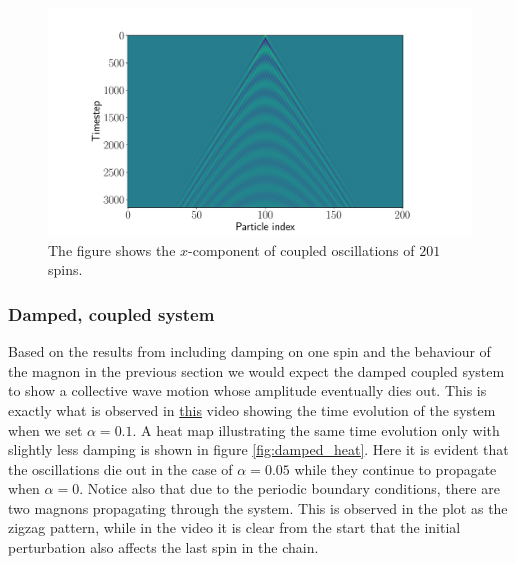\begin{remark}
\begin{figure}[htb]
	\centering
	\includegraphics[width=\columnwidth]{../fig/wave_200.pdf}
	\caption{The figure shows the $x$-component of coupled oscillations of $201$ spins.}
	\label{fig:200_heat}
\end{figure}

\end{remark}

\subsubsection{Damped, coupled system}

Based on the results from including damping on one spin and the behaviour of the magnon in the previous section we would expect the damped coupled system to show a collective wave motion whose amplitude eventually dies out. This is exactly what is observed in \href{https://folk.ntnu.no/sondrdl/spinwaves/coupled_spins_damped.mp4}{this} video showing the time evolution of the system when we set $\alpha = 0.1$. A heat map illustrating the same time evolution only with slightly less damping is shown in figure \ref{fig:damped_heat}. Here it is evident that the oscillations die out in the case of $\alpha = 0.05$ while they continue to propagate when $\alpha = 0$. Notice also that due to the periodic boundary conditions, there are two magnons propagating through the system. This is observed in the plot as the zigzag pattern, while in the video it is clear from the start that the initial perturbation also affects the last spin in the chain.

